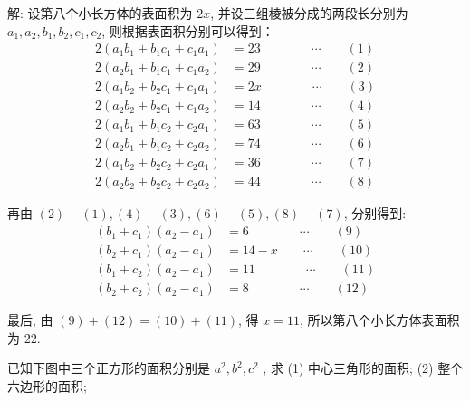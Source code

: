 解: 设第八个小长方体的表面积为 $2x$, 并设三组棱被分成的两段长分别为 $a_1, a_2, b_1, b_2, c_1, c_2$, 则根据表面积分别可以得到：
\begin{align*}
2(a_1b_1 + b_1c_1 + c_1a_1) &= 23 \qquad\qquad\cdots\qquad (1)\\
2(a_2b_1 + b_1c_1 + c_1a_2) &= 29 \qquad\qquad\cdots\qquad (2)\\
2(a_1b_2 + b_2c_1 + c_1a_1) &= 2x \qquad\qquad\cdots\qquad (3)\\
2(a_2b_2 + b_2c_1 + c_1a_2) &= 14 \qquad\qquad\cdots\qquad (4)\\
2(a_1b_1 + b_1c_2 + c_2a_1) &= 63 \qquad\qquad\cdots\qquad (5)\\
2(a_2b_1 + b_1c_2 + c_2a_2) &= 74 \qquad\qquad\cdots\qquad (6)\\
2(a_1b_2 + b_2c_2 + c_2a_1) &= 36 \qquad\qquad\cdots\qquad (7)\\
2(a_2b_2 + b_2c_2 + c_2a_2) &= 44 \qquad\qquad\cdots\qquad (8)
\end{align*}

再由 $(2) - (1), (4) - (3), (6) - (5), (8) - (7)$, 分别得到:
\begin{align*}
(b_1+c_1)(a_2-a_1) &= 6 \qquad\qquad\cdots\qquad (9)\\
(b_2+c_1)(a_2-a_1) &= 14-x \qquad\cdots\qquad (10)\\
(b_1+c_2)(a_2-a_1) &= 11 \qquad\qquad\cdots\qquad (11)\\
(b_2+c_2)(a_2-a_1) &= 8 \qquad\qquad\cdots\qquad (12)
\end{align*}

最后, 由 $(9)+(12)=(10)+(11)$, 得 $x=11$, 所以第八个小长方体表面积为 $22$.

\newpage

已知下图中三个正方形的面积分别是 $a^2, b^2, c^2$ , 求 (1) 中心三角形的面积; (2) 整个六边形的面积;

